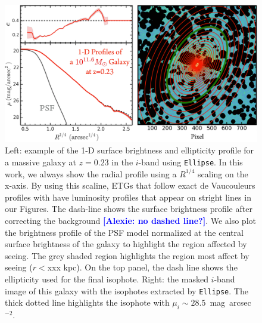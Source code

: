 \documentclass{emulateapj}
\def\sb{mag~arcsec$^{-2}$}
\newcommand{\alexie}[1]{\textcolor{blue}{\textbf{[Alexie: #1]}}}
\begin{document}
\begin{CJK*}{UTF8}{gbsn}
    \begin{figure}[bt]
        \centering 
        \includegraphics[width=\textwidth]{fig/redbcg_ellipse_example}
        \caption{Left: example of the 1-D surface brightness and ellipticity profile 
            for a massive galaxy at $z=0.23$ in the $i$-band using \texttt{Ellipse}. 
            In this work, we always show the radial profile using a $R^{1/4}$ scaling on the x-axis. By using this scaline, ETGs that follow exact de Vaucouleurs profiles with have luminosity profiles that appear on stright lines in our Figures. The dash-line shows the surface brightness profile after correcting the background \alexie{no dashed line?}. We also plot the brightness profile of the PSF model normalized at the 
            central surface brightness of the galaxy to highlight the region affected 
            by seeing. The grey shaded region highlights the region most affect by seeing ($r<$xxx kpc).
            On the top panel, the dash line shows the ellipticity used for the final 
            isophote. Right: the masked $i$-band image of this galaxy with the isophotes extracted 
            by \texttt{Ellipse}. The thick dotted line highlights the isophote with $\mu_{i}\sim 28.5$~\sb.}
        \label{fig:ellipse}
    \end{figure}


\end{CJK*}
\end{document}

